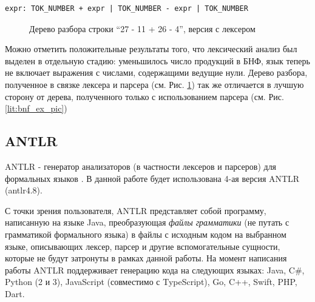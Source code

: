 \begin{code}
\label{lit:parser_bnf}
\begin{verbatim}
expr: TOK_NUMBER + expr | TOK_NUMBER - expr | TOK_NUMBER
\end{verbatim}
\end{code}

\begin{figure}[ht]
\begin{center}
\caption{
\label{lit:parser_bnf_pic} Дерево разбора строки \enquote{27 - 11 + 26 - 4}, версия с лексером
}
\end{center}
\end{figure}

Можно отметить положительные результаты того, что лексический анализ был выделен в отдельную стадию: уменьшилось число продукций в БНФ, язык теперь не включает выражения с числами, содержащими ведущие нули. Дерево разбора, полученное в связке лексера и парсера (см. Рис. \ref{lit:parser_bnf_pic}) так же отличается в лучшую сторону от дерева, полученного только с использованием парсера (см. Рис. \ref{lit:bnf_ex_pic})

\subsection{ANTLR}
ANTLR - генератор анализаторов (в частности лексеров и парсеров) для формальных языков \cite{antlr_web}\cite{antlr_paper}\cite{antlr_book}. В данной работе будет использована 4-ая версия ANTLR (antlr4.8).

С точки зрения пользователя, ANTLR представляет собой программу, написанную на языке Java, преобразующая \textit{файлы грамматики} (не путать с грамматикой формального языка) в файлы с исходным кодом на выбранном языке, описывающих лексер, парсер и другие вспомогательные сущности, которые не будут затронуты в рамках данной работы. На момент написания работы ANTLR поддерживает генерацию кода на следующих языках: Java, C\#, Python (2 и 3), JavaScript (совместимо с TypeScript), Go, C++, Swift, PHP, Dart.

